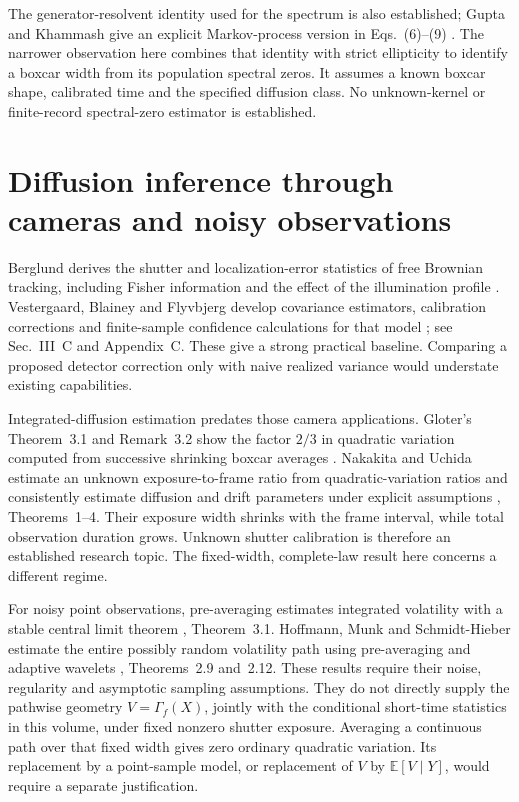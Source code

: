 The generator-resolvent identity used for the spectrum is also established;
Gupta and Khammash give an explicit Markov-process version in
Eqs.~(6)--(9) \cite{dgGupta2022}. The narrower observation here combines
that identity with strict ellipticity to identify a boxcar width from its
population spectral zeros. It assumes a known boxcar shape, calibrated
time and the specified diffusion class. No unknown-kernel or finite-record
spectral-zero estimator is established.

\section{Diffusion inference through cameras and noisy observations}
Berglund derives the shutter and localization-error statistics of free
Brownian tracking, including Fisher information and the effect of the
illumination profile \cite{dgBerglund2010}. Vestergaard, Blainey and
Flyvbjerg develop covariance estimators, calibration corrections and
finite-sample confidence calculations for that model
\cite{dgVestergaard2014}; see Sec.~III~C and Appendix~C. These give a
strong practical baseline. Comparing a proposed detector correction only
with naive realized variance would understate existing capabilities.

Integrated-diffusion estimation predates those camera applications.
Gloter's Theorem~3.1 and Remark~3.2 show the factor $2/3$ in quadratic
variation computed from successive shrinking boxcar averages
\cite{dgGloter2000}. Nakakita and Uchida estimate an unknown
exposure-to-frame ratio from quadratic-variation ratios and consistently
estimate diffusion and drift parameters under explicit assumptions
\cite{dgNakakita2020}, Theorems~1--4. Their exposure width shrinks with
the frame interval, while total observation duration grows. Unknown
shutter calibration is therefore an established research topic. The
fixed-width, complete-law result here concerns a different regime.

For noisy point observations, pre-averaging estimates integrated volatility
with a stable central limit theorem \cite{dgJacod2009}, Theorem~3.1.
Hoffmann, Munk and Schmidt-Hieber estimate the entire possibly random
volatility path using pre-averaging and adaptive wavelets
\cite{dgHoffmann2012}, Theorems~2.9 and~2.12. These results require their
noise, regularity and asymptotic sampling assumptions. They do not directly
supply the pathwise geometry $V=\Gamma_f(X)$, jointly with the conditional
short-time statistics in this volume, under fixed nonzero shutter exposure.
Averaging a continuous path over that fixed width gives zero ordinary
quadratic variation. Its replacement by a point-sample model, or replacement
of $V$ by $\mathbb E[V\mid Y]$, would require a separate justification.

